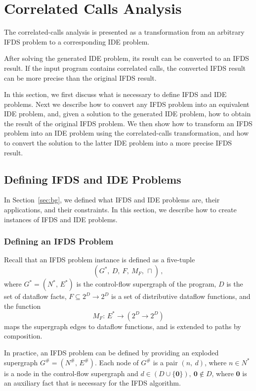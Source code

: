 \section{Correlated Calls Analysis}\label{chapter:cca}
The correlated-calls analysis is presented as a transformation from an arbitrary IFDS problem to a corresponding IDE problem.

After solving the generated IDE problem, its result can be converted to an IFDS result. If the input program contains correlated calls, the converted IFDS result can be more precise than the original IFDS result.

In this section, we first discuss what is necessary to define IFDS and IDE problems. Next we describe how to convert any IFDS problem into an equivalent IDE problem, and, given a solution to the generated IDE problem, how to obtain the result of the original IFDS problem. We then show how to transform an IFDS problem into an IDE problem using the correlated-calls transformation, and how to convert the solution to the latter IDE problem into a more precise IFDS result.

\subsection{Defining IFDS and IDE Problems}
In Section~\ref{sec:bg}, we defined what IFDS and IDE problems are, their applications, and their constraints. In this section, we describe how to create instances of IFDS and IDE problems.

\subsubsection{Defining an IFDS Problem}\label{sec:ifdsdef}
Recall that an IFDS problem instance is defined as a five-tuple
\[
    (G^*,\ D,\ F,\ M_F,\,\sqcap)\,,
\]
where $G^*=(N^*,\,E^*)$ is the control-flow supergraph of the program, $D$ is the set of dataflow facts, $F\subseteq2^D\to2^D$ is a set of distributive dataflow functions, and the function $$M_F:\,E^*\to(2^D\to2^D)$$ maps the supergraph edges to dataflow functions, and is extended to paths by composition.

In practice, an IFDS problem can be defined by providing an exploded supergraph
$G^\#=(N^\#,\,E^\#)$. Each node of $G^\#$ is a pair $(n,\ d)$, where $n\in N^*$ is a node in the control-flow supergraph and $d\in (D\cup\{\mathbf{0}\}),\ \mathbf0\notin D$, where $\mathbf0$ is an auxiliary fact that is necessary for the IFDS algorithm.

